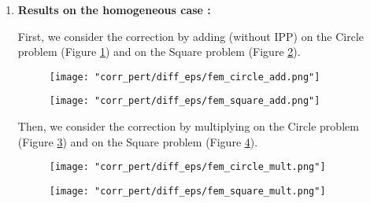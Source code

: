 \begin{enumerate}[label=\textbullet]
	\item \textbf{Results on the homogeneous case :}
	
	First, we consider the correction by adding (without IPP) on the Circle problem (Figure \ref{corr_pert_fem_circle_add}) and on the Square problem (Figure \ref{corr_pert_fem_square_add}).
	
	\begin{minipage}{0.48\linewidth}
		\begin{figure}[H]
			\centering
			\texttt{[image: "corr\_pert/diff\_eps/fem\_circle\_add.png"]}
			\label{corr_pert_fem_circle_add}
		\end{figure} 
	\end{minipage}
	\begin{minipage}{0.48\linewidth}
		\begin{figure}[H]
			\centering
			\texttt{[image: "corr\_pert/diff\_eps/fem\_square\_add.png"]}
			\label{corr_pert_fem_square_add}
		\end{figure} 
	\end{minipage}
	
	Then, we consider the correction by multiplying on the Circle problem (Figure \ref{corr_pert_fem_circle_mult}) and on the Square problem (Figure \ref{corr_pert_fem_square_mult}).
	
	\begin{minipage}{0.48\linewidth}
		\begin{figure}[H]
			\centering
			\texttt{[image: "corr\_pert/diff\_eps/fem\_circle\_mult.png"]}
			\label{corr_pert_fem_circle_mult}
		\end{figure} 
	\end{minipage}
	\begin{minipage}{0.48\linewidth}
		\begin{figure}[H]
			\centering
			\texttt{[image: "corr\_pert/diff\_eps/fem\_square\_mult.png"]}
			\label{corr_pert_fem_square_mult}
		\end{figure} 
	\end{minipage}
	

\end{enumerate}

